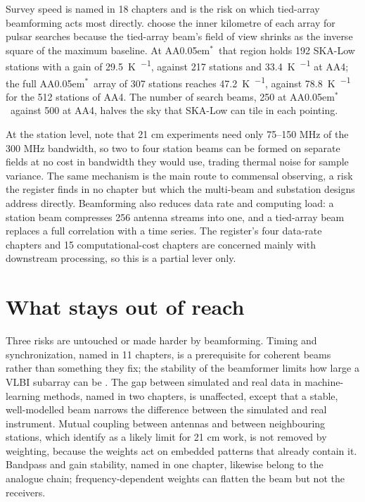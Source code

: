 \documentclass[11pt,a4paper]{article}
\newcommand{\AAstar}{AA\kern0.05em$^{*}$}
\begin{document}
Survey speed is named in 18 chapters and is the risk on which tied-array beamforming acts most directly. \citet{Keane2026} choose the inner kilometre of each array for pulsar searches because the tied-array beam's field of view shrinks as the inverse square of the maximum baseline. At \AAstar\ that region holds 192 SKA-Low stations with a gain of \SI{29.5}{\kelvin\per\jansky}, against 217 stations and \SI{33.4}{\kelvin\per\jansky} at AA4; the full \AAstar\ array of 307 stations reaches \SI{47.2}{\kelvin\per\jansky}, against \SI{78.8}{\kelvin\per\jansky} for the 512 stations of AA4. The number of search beams, 250 at \AAstar\ against 500 at AA4, halves the sky that SKA-Low can tile in each pointing.

At the station level, \citet{Trott2026} note that 21 cm experiments need only 75--150 MHz of the 300 MHz bandwidth, so two to four station beams can be formed on separate fields at no cost in bandwidth they would use, trading thermal noise for sample variance. The same mechanism is the main route to commensal observing, a risk the register finds in no chapter but which the multi-beam and substation designs address directly. Beamforming also reduces data rate and computing load: a station beam compresses 256 antenna streams into one, and a tied-array beam replaces a full correlation with a time series. The register's four data-rate chapters and 15 computational-cost chapters are concerned mainly with downstream processing, so this is a partial lever only.

\section{What stays out of reach}

Three risks are untouched or made harder by beamforming. Timing and synchronization, named in 11 chapters, is a prerequisite for coherent beams rather than something they fix; the stability of the beamformer limits how large a VLBI subarray can be \citep{SKAO2021}. The gap between simulated and real data in machine-learning methods, named in two chapters, is unaffected, except that a stable, well-modelled beam narrows the difference between the simulated and real instrument. Mutual coupling between antennas and between neighbouring stations, which \citet{deLeraAcedo2026} identify as a likely limit for 21 cm work, is not removed by weighting, because the weights act on embedded patterns that already contain it. Bandpass and gain stability, named in one chapter, likewise belong to the analogue chain; frequency-dependent weights can flatten the beam but not the receivers.
\end{document}

